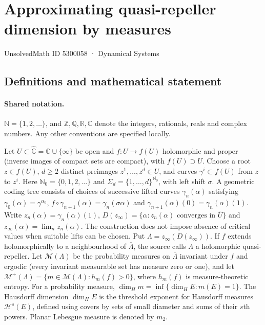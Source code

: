 \documentclass[11pt]{article}
\begin{document}
\setcounter{section}{5300057}
\section{Approximating quasi-repeller dimension by measures}\label{5300058}
{\small\sffamily UnsolvedMath ID 5300058 · Dynamical Systems}
\subsection{Definitions and mathematical statement}

\paragraph{Shared notation.}$\mathbb N=\{1,2,\ldots\}$, and $\mathbb Z,\mathbb Q,\mathbb R,\mathbb C$ denote the integers, rationals, reals and complex numbers. Any other conventions are specified locally.


Let $U\subset\widehat{\mathbb C}=\mathbb C\cup\{\infty\}$ be open and $f:U\to f(U)$ holomorphic and proper (inverse images of compact sets are compact), with $f(U)\supset U$. Choose a root $z\in f(U)$, $d\geq2$ distinct preimages $z^1,\ldots,z^d\in U$, and curves $\gamma^i\subset f(U)$ from $z$ to $z^i$. Here $\mathbb N_0=\{0,1,2,\ldots\}$ and $\Sigma_d=\{1,\ldots,d\}^{\mathbb N_0}$, with left shift $\sigma$. A geometric coding tree consists of choices of successive lifted curves $\gamma_n(\alpha)$ satisfying $\gamma_0(\alpha)=\gamma^{\alpha_0}$, $f\circ\gamma_{n+1}(\alpha)=\gamma_n(\sigma\alpha)$ and $\gamma_{n+1}(\alpha)(0)=\gamma_n(\alpha)(1)$. Write $z_n(\alpha)=\gamma_n(\alpha)(1)$, $D(z_\infty)=\{\alpha:z_n(\alpha)\text{ converges in }\overline U\}$ and $z_\infty(\alpha)=\lim_n z_n(\alpha)$. The construction does not impose absence of critical values when suitable lifts can be chosen. Put $\Lambda=z_\infty(D(z_\infty))$. If $f$ extends holomorphically to a neighbourhood of $\overline\Lambda$, the source calls $\Lambda$ a holomorphic quasi-repeller. Let $\mathcal M(\Lambda)$ be the probability measures on $\overline\Lambda$ invariant under $f$ and ergodic (every invariant measurable set has measure zero or one), and let $\mathcal M^+(\Lambda)=\{m\in\mathcal M(\Lambda):h_m(f)>0\}$, where $h_m(f)$ is measure-theoretic entropy. For a probability measure, $\dim_Hm=\inf\{\dim_HE:m(E)=1\}$. The Hausdorff dimension $\dim_H E$ is the threshold exponent for Hausdorff measures $\mathcal H^s(E)$, defined using covers by sets of small diameter and sums of their $s$th powers. Planar Lebesgue measure is denoted by $m_2$.
\end{document}
